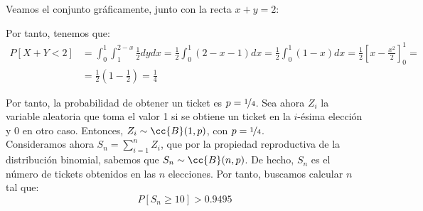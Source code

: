 \documentclass[12pt]{article}
\begin{document}
\begin{ejercicio}
        Veamos el conjunto gráficamente, junto con la recta $x+y=2$:
        \begin{center}
        \end{center}

        Por tanto, tenemos que:
        \begin{align*}
            P[X+Y<2] &= \int_{0}^{1}\int_{1}^{2-x}\frac{1}{2}dydx = \frac{1}{2}\int_{0}^{1}(2-x-1)dx = \frac{1}{2}\int_{0}^{1}(1-x)dx = \frac{1}{2}\left[x-\frac{x^2}{2}\right]_{0}^{1} =\\&= \frac{1}{2}\left(1-\frac{1}{2}\right) = \frac{1}{4}
        \end{align*}

        Por tanto, la probabilidad de obtener un ticket es $p=\nicefrac{1}{4}$. Sea ahora $Z_i$ la variable aleatoria que toma el valor 1 si se obtiene un ticket en la $i$-ésima elección y 0 en otro caso. Entonces, $Z_i\sim \cc{B}(1,p)$, con $p=\nicefrac{1}{4}$.\\

        Consideramos ahora $S_n=\sum\limits_{i=1}^n Z_i$, que por la propiedad reproductiva de la distribución binomial, sabemos que $S_n\sim \cc{B}(n,p)$. De hecho, $S_n$ es el número de tickets obtenidos en las $n$ elecciones. Por tanto, buscamos calcular $n$ tal que:
        \begin{equation*}
            P[S_n\geq 10] > 0.9495
        \end{equation*}


\end{ejercicio}
\end{document}
